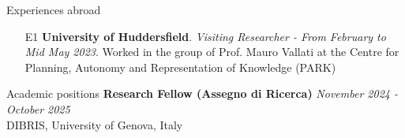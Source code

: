\documentclass{resume} %
\begin{document}

\begin{rSection}{Experiences abroad}
\begin{enumerate}[leftmargin=5mm]
\item[E1] \textbf{University of Huddersfield}. \textit{Visiting Researcher - From February to Mid May 2023}. Worked in the group of Prof. Mauro Vallati at the Centre for Planning, Autonomy and Representation of Knowledge (PARK)  
\end{enumerate}
\end{rSection}





\begin{rSection}{Academic positions}
{\bf  Research Fellow (Assegno di Ricerca)} \hfill {\em November 2024 - \textit{October 2025}} \\ 
DIBRIS, University of Genova, Italy
\end{rSection}
\end{document}
